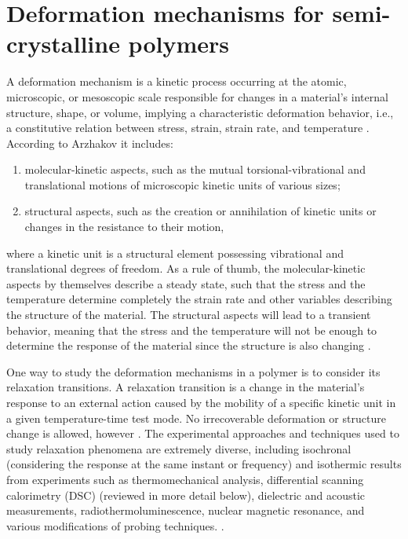 \section{Deformation mechanisms for semi-crystalline polymers}
A deformation mechanism is a kinetic process occurring at the atomic, microscopic, or mesoscopic scale responsible for changes in a material's internal structure, shape, or volume, implying a characteristic deformation behavior, i.e., a constitutive relation between stress, strain, strain rate, and temperature \citep{frostDeformationmechanismMapsPlasticity1982}.
According to Arzhakov \citep{arzhakovRelaxationPhysicalMechanical2019}  it includes:
\begin{enumerate}
    \item molecular-kinetic aspects, such as the mutual torsional-vibrational and translational motions of microscopic kinetic units of various sizes;
    \item structural aspects, such as the creation or annihilation of kinetic units or changes in the resistance to their motion,
\end{enumerate}
where a kinetic unit is a structural element possessing vibrational and translational degrees of freedom.
As a rule of thumb, the molecular-kinetic aspects by themselves describe a steady state, such that the stress and the temperature determine completely the strain rate and other variables describing the structure of the material.
The structural aspects will lead to a transient behavior, meaning that the stress and the temperature will not be enough to determine the response of the material since the structure is also changing \citep{frostDeformationmechanismMapsPlasticity1982}.

One way to study the deformation mechanisms in a polymer is to consider its relaxation transitions.
A relaxation transition is a change in the material's response to an external action caused by the mobility of a specific kinetic unit in a given temperature-time test mode.
No irrecoverable deformation or structure change is allowed, however \citep{arzhakovRelaxationPhysicalMechanical2019}.
The experimental approaches and techniques used to study relaxation phenomena are extremely diverse, including isochronal (considering the response at the same instant or frequency) and isothermic results from experiments such as thermomechanical analysis, differential scanning calorimetry (DSC) (reviewed in more detail below), dielectric and acoustic measurements, radiothermoluminescence, nuclear magnetic resonance, and various modifications of probing techniques. \citep{ferryViscoelasticPropertiesPolymers1980, arzhakovRelaxationPhysicalMechanical2019}.

